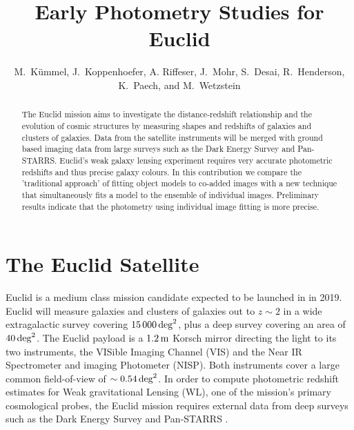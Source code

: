 
\resetcounters




\title{Early Photometry Studies for Euclid}
\author{M.\ K\"ummel, J.\ Koppenhoefer, A. Riffeser, J.\ Mohr,
S.\ Desai, R.\ Henderson, K.\ Paech, and M.\ Wetzstein
}


\begin{abstract}
The Euclid mission aims to investigate the distance-redshift relationship and the evolution of cosmic structures by measuring shapes and redshifts of galaxies and clusters of galaxies. Data from the satellite instruments will be merged with ground based imaging data from large surveys such as the Dark Energy Survey and Pan-STARRS. Euclid's weak galaxy lensing experiment requires very accurate photometric redshifts and thus precise galaxy colours. In this contribution we compare the 'traditional approach' of fitting object models to co-added images with a new technique that simultaneously fits a model to the ensemble of individual images. Preliminary results indicate that the photometry using individual image fitting is more precise.
\end{abstract}

\section{The Euclid Satellite}
Euclid \citep{2011arXiv1110.3193L} is a medium class mission candidate expected to be launched in in 2019. Euclid will measure galaxies and clusters of galaxies out to $z\sim2$ in a wide extragalactic survey covering $15\,000\,\rm{deg}^2$, plus a deep survey covering an area of $40\,\rm{deg}^2$. The Euclid payload is a $1.2\,\rm{m}$ Korsch mirror directing the light to its two instruments, the VISible Imaging Channel (VIS) and the Near IR Spectrometer and imaging Photometer (NISP). Both instruments cover a large common field-of-view of $\sim0.54\,\rm{deg}^2$. In order to compute photometric redshift estimates for Weak gravitational Lensing (WL), one of the mission's primary cosmological probes, the Euclid mission requires external data from deep surveys such as the Dark Energy Survey \citep[DES]{2012APS..APR.D7007F} and Pan-STARRS \citep{2002SPIE.4836..154K}.

